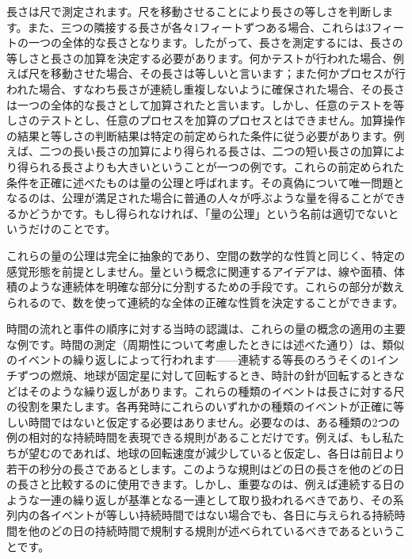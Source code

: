\documentclass[a4paper,11pt,openany]{ltjsbook}
\begin{document}
長さは尺で測定されます。尺を移動させることにより長さの等しさを判断します。また、三つの隣接する長さが各々1フィートずつある場合、これらは3フィートの一つの全体的な長さとなります。したがって、長さを測定するには、長さの等しさと長さの加算を決定する必要があります。何かテストが行われた場合、例えば尺を移動させた場合、その長さは等しいと言います；また何かプロセスが行われた場合、すなわち長さが連続し重複しないように確保された場合、その長さは一つの全体的な長さとして加算されたと言います。しかし、任意のテストを等しさのテストとし、任意のプロセスを加算のプロセスとはできません。加算操作の結果と等しさの判断結果は特定の前定められた条件に従う必要があります。例えば、二つの長い長さの加算により得られる長さは、二つの短い長さの加算により得られる長さよりも大きいということが一つの例です。これらの前定められた条件を正確に述べたものは量の公理と呼ばれます。その真偽について唯一問題となるのは、公理が満足された場合に普通の人々が呼ぶような量を得ることができるかどうかです。もし得られなければ、「量の公理」という名前は適切でないというだけのことです。

これらの量の公理は完全に抽象的であり、空間の数学的な性質と同じく、特定の感覚形態を前提としません。量という概念に関連するアイデアは、線や面積、体積のような連続体を明確な部分に分割するための手段です。これらの部分が数えられるので、数を使って連続的な全体の正確な性質を決定することができます。

時間の流れと事件の順序に対する当時の認識は、これらの量の概念の適用の主要な例です。時間の測定（周期性について考慮したときには述べた通り）は、類似のイベントの繰り返しによって行われます——連続する等長のろうそくの1インチずつの燃焼、地球が固定星に対して回転するとき、時計の針が回転するときなどはそのような繰り返しがあります。これらの種類のイベントは長さに対する尺の役割を果たします。各再発時にこれらのいずれかの種類のイベントが正確に等しい時間ではないと仮定する必要はありません。必要なのは、ある種類の2つの例の相対的な持続時間を表現できる規則があることだけです。例えば、もし私たちが望むのであれば、地球の回転速度が減少していると仮定し、各日は前日より若干の秒分の長さであるとします。このような規則はどの日の長さを他のどの日の長さと比較するのに使用できます。しかし、重要なのは、例えば連続する日のような一連の繰り返しが基準となる一連として取り扱われるべきであり、その系列内の各イベントが等しい持続時間ではない場合でも、各日に与えられる持続時間を他のどの日の持続時間で規制する規則が述べられているべきであるということです。
\end{document}
